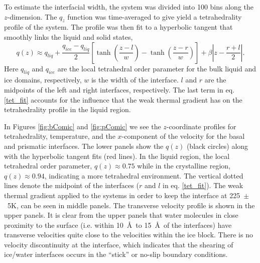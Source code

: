 To estimate the interfacial width, the system was divided into 100
bins along the $z$-dimension.  The $q_{z}$ function was time-averaged
to give yield a tetrahedrality profile of the system. The profile was
then fit to a hyperbolic tangent that smoothly links the liquid and
solid states,
\begin{equation}\label{tet_fit}
q(z) \approx
q_{liq}+\frac{q_{ice}-q_{liq}}{2}\left[\tanh\left(\frac{z-l}{w}\right)-\tanh\left(\frac{z-r}{w}\right)\right]+\beta\left|z-
\frac{r+l}{2}\right|.
\end{equation}
Here $q_{liq}$ and $q_{ice}$ are the local tetrahedral order parameter
for the bulk liquid and ice domains, respectively, $w$ is the width of
the interface.  $l$ and $r$ are the midpoints of the left and right
interfaces, respectively.  The last term in eq. \eqref{tet_fit}
accounts for the influence that the weak thermal gradient has on the
tetrahedrality profile in the liquid region. 

In Figures \ref{fig:bComic} and \ref{fig:pComic} we see the
$z$-coordinate profiles for tetrahedrality, temperature, and the
$x$-component of the velocity for the basal and prismatic interfaces.
The lower panels show the $q(z)$ (black circles) along with the
hyperbolic tangent fits (red lines). In the liquid region, the local
tetrahedral order parameter, $q(z) \approx 0.75$ while in the
crystalline region, $q(z) \approx 0.94$, indicating a more tetrahedral
environment.  The vertical dotted lines denote the midpoint of the
interfaces ($r$ and $l$ in eq. \eqref{tet_fit}). The weak thermal
gradient applied to the systems in order to keep the interface at
225~$\pm$~5K, can be seen in middle panels.  The transverse velocity
profile is shown in the upper panels.  It is clear from the upper
panels that water molecules in close proximity to the surface (i.e.
within 10~\AA\ to 15~\AA~of the interfaces) have transverse velocities
quite close to the velocities within the ice block.  There is no
velocity discontinuity at the interface, which indicates that the
shearing of ice/water interfaces occurs in the ``stick'' or no-slip
boundary conditions.

